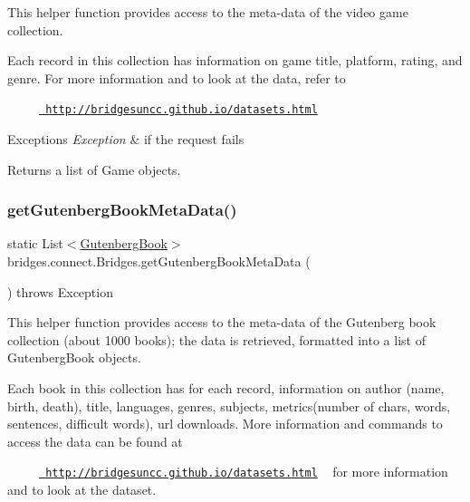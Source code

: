 This helper function provides access to the meta-\/data of the video game collection.

Each record in this collection has information on game title, platform, rating, and genre. For more information and to look at the data, refer to 

~~~~~\href{http://bridgesuncc.github.io/datasets.html}{\texttt{ http\+://bridgesuncc.\+github.\+io/datasets.\+html}} 


\begin{DoxyExceptions}{Exceptions}
{\em Exception} & if the request fails\\
\hline
\end{DoxyExceptions}
\begin{DoxyReturn}{Returns}
a list of Game objects. 
\end{DoxyReturn}
\mbox{\label{classbridges_1_1connect_1_1_bridges_a7847b5a45cae8491acd5b6fb0015415b}} 
\subsubsection{\texorpdfstring{getGutenbergBookMetaData()}{getGutenbergBookMetaData()}}
{\footnotesize\ttfamily static List$<$\mbox{\hyperlink{classbridges_1_1data__src__dependent_1_1_gutenberg_book}{Gutenberg\+Book}}$>$ bridges.\+connect.\+Bridges.\+get\+Gutenberg\+Book\+Meta\+Data (\begin{DoxyParamCaption}{ }\end{DoxyParamCaption}) throws Exception\hspace{0.3cm}{\ttfamily [static]}}

This helper function provides access to the meta-\/data of the Gutenberg book collection (about 1000 books); the data is retrieved, formatted into a list of Gutenberg\+Book objects.

Each book in this collection has for each record, information on author (name, birth, death), title, languages, genres, subjects, metrics(number of chars, words, sentences, difficult words), url downloads. More information and commands to access the data can be found at 

~~~~~\href{http://bridgesuncc.github.io/datasets.html}{\texttt{ http\+://bridgesuncc.\+github.\+io/datasets.\+html}} ~\newline
 for more information and to look at the dataset.



